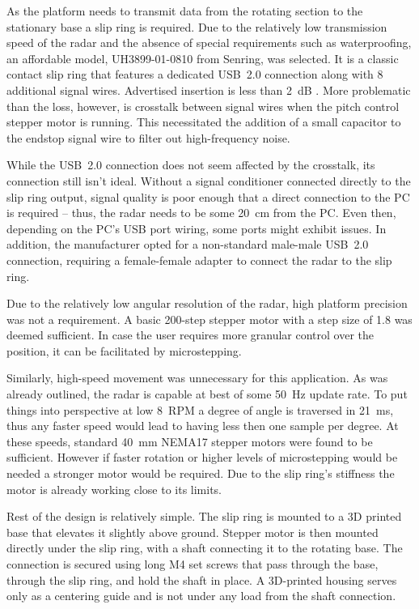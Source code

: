 As the platform needs to transmit data from the rotating section to the stationary base a slip ring is required.
Due to the relatively low transmission speed of the radar and the absence of special requirements such as waterproofing, an affordable model, UH3899-01-0810 from Senring, was selected.
It is a classic contact slip ring that features a dedicated USB~2.0 connection along with 8 additional signal wires.
Advertised insertion is less than 2~dB \cite{slipring}.
More problematic than the loss, however, is crosstalk between signal wires when the pitch control stepper motor is running.
This necessitated the addition of a small capacitor to the endstop signal wire to filter out high-frequency noise.

While the USB~2.0 connection does not seem affected by the crosstalk, its connection still isn't ideal.
Without a signal conditioner connected directly to the slip ring output, signal quality is poor enough that a direct connection to the PC is required -- thus, the radar needs to be some 20~cm from the PC.
Even then, depending on the PC's USB port wiring, some ports might exhibit issues.
In addition, the manufacturer opted for a non-standard male-male USB~2.0 connection, requiring a female-female adapter to connect the radar to the slip ring.

Due to the relatively low angular resolution of the radar, high platform precision was not a requirement.
A basic 200-step stepper motor with a step size of 1.8 was deemed sufficient.
In case the user requires more granular control over the position, it can be facilitated by microstepping.

Similarly, high-speed movement was unnecessary for this application.
As was already outlined, the radar is capable at best of some 50~Hz update rate.
To put things into perspective at low 8~RPM a degree of angle is traversed in 21~ms, thus any faster speed would lead to having less then one sample per degree.
At these speeds, standard 40~mm NEMA17 stepper motors were found to be sufficient.
However if faster rotation or higher levels of microstepping would be needed a stronger motor would be required.
Due to the slip ring's stiffness the motor is already working close to its limits.

Rest of the design is relatively simple.
The slip ring is mounted to a 3D printed base that elevates it slightly above ground.
Stepper motor is then mounted directly under the slip ring, with a shaft connecting it to the rotating base.
The connection is secured using long M4 set screws that pass through the base, through the slip ring, and hold the shaft in place.
A 3D-printed housing serves only as a centering guide and is not under any load from the shaft connection.

